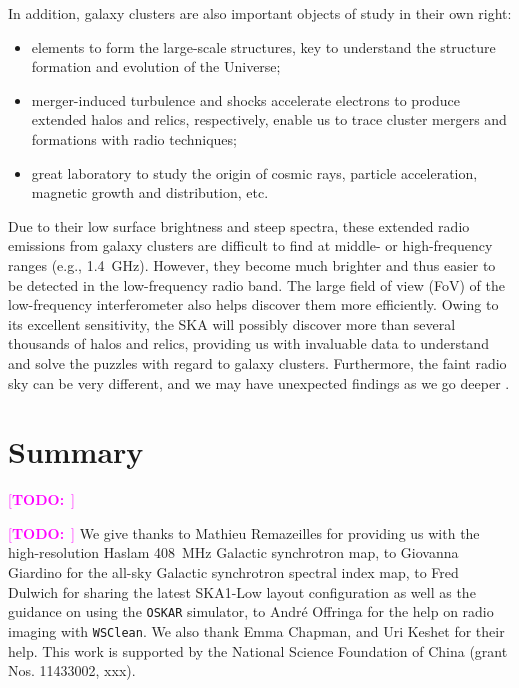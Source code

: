 \documentclass[modern]{aastex61}
\newcommand{\TODO}[1]{\textcolor{magenta}{[\textbf{TODO:}~\uuline{#1}]}}
\begin{document}
In addition, galaxy clusters are also important objects of study in their
own right:
\begin{itemize}
  \item elements to form the large-scale structures, key to understand the
    structure formation and evolution of the Universe;
  \item merger-induced turbulence and shocks accelerate electrons to produce
    extended halos and relics, respectively, enable us to trace cluster
    mergers and formations with radio techniques;
  \item great laboratory to study the origin of cosmic rays, particle
    acceleration, magnetic growth and distribution, etc.
\end{itemize}

Due to their low surface brightness and steep spectra, these extended
radio emissions from galaxy clusters are difficult to find at middle-
or high-frequency ranges (e.g., \SI{1.4}{\GHz}).
However, they become much brighter and thus easier to be detected in
the low-frequency radio band.  The large field of view (FoV) of the
low-frequency interferometer also helps discover them more efficiently.
Owing to its excellent sensitivity, the SKA will possibly discover more
than several thousands of halos and relics, providing us with invaluable
data to understand and solve the puzzles with regard to galaxy clusters.
Furthermore, the faint radio sky can be very different, and we may have
unexpected findings as we go deeper \citep{padovani2016rev,herreraRuiz2017}.


\section{Summary}
\label{sec:summary}

\TODO{Write!!!}


\acknowledgments

\TODO{update}
We give thanks
to Mathieu Remazeilles for providing us with the high-resolution Haslam
\SI{408}{\MHz} Galactic synchrotron map,
to Giovanna Giardino for the all-sky Galactic synchrotron spectral index map,
to Fred Dulwich for sharing the latest SKA1-Low layout configuration as well
as the guidance on using the \texttt{OSKAR} simulator,
to Andr\'e Offringa for the help on radio imaging with \texttt{WSClean}.
We also thank Emma Chapman, and Uri Keshet for their help.
This work is supported by the National Science Foundation of China
(grant Nos. 11433002, xxx).
\end{document}
